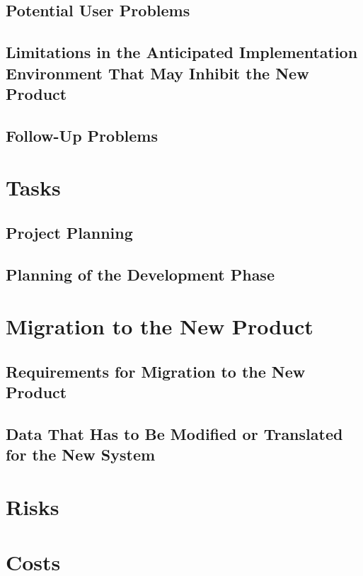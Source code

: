 \documentclass{article}
\begin{document}
\subsection{Potential User Problems}


\subsection{Limitations in the Anticipated Implementation Environment That May Inhibit the New Product}


\subsection{Follow-Up Problems}


\section{Tasks}

\subsection{Project Planning}


\subsection{Planning of the Development Phase}


\section{Migration to the New Product}

\subsection{Requirements for Migration to the New Product}


\subsection{Data That Has to Be Modified or Translated for the New System}


\section{Risks}

\section{Costs}
\end{document}
